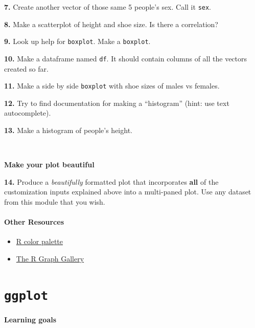 \documentclass[
]{book}
\providecommand{\tightlist}{%
  \setlength{\itemsep}{0pt}\setlength{\parskip}{0pt}}
\begin{document}
\textbf{7.} Create another vector of those same 5 people's sex. Call it \texttt{sex}.

\textbf{8.} Make a scatterplot of height and shoe size. Is there a correlation?

\textbf{9.} Look up help for \texttt{boxplot}. Make a \texttt{boxplot}.

\textbf{10.} Make a dataframe named \texttt{df}. It should contain columns of all the vectors created so far.

\textbf{11.} Make a side by side \texttt{boxplot} with shoe sizes of males vs females.

\textbf{12.} Try to find documentation for making a ``histogram'' (hint: use text autocomplete).

\textbf{13.} Make a histogram of people's height.

~

\textbf{Make your plot beautiful}

\textbf{14.} Produce a \emph{beautifully} formatted plot that incorporates \textbf{all} of the customization inputs explained above into a multi-paned plot. Use any dataset from this module that you wish.

\hypertarget{other-resources-2}{%
\subsubsection*{Other Resources}\label{other-resources-2}}

\begin{itemize}
\tightlist
\item
  \href{http://www.stat.columbia.edu/~tzheng/files/Rcolor.pdf}{R color palette}\\
\item
  \href{https://www.r-graph-gallery.com/}{The R Graph Gallery}
\end{itemize}

\hypertarget{ggplot}{%
\chapter{\texorpdfstring{\texttt{ggplot}}{ggplot}}\label{ggplot}}

\hypertarget{learning-goals-9}{%
\subsubsection*{Learning goals}\label{learning-goals-9}}
\end{document}
